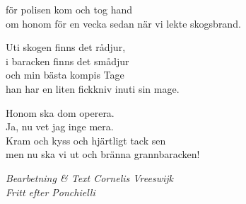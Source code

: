för polisen kom och tog hand\\
om honom för en vecka sedan när vi lekte skogsbrand.\par
\vspace{10pt}
Uti skogen finns det rådjur,\\
i baracken finns det smådjur\\
och min bästa kompis Tage\\
han har en liten fickkniv inuti sin mage.\par
\vspace{10pt}
Honom ska dom operera.\\
Ja, nu vet jag inge mera.\\
Kram och kyss och hjärtligt tack sen\\
men nu ska vi ut och bränna grannbaracken!\par
\vspace{10pt}
{\footnotesize\textit{Bearbetning \& Text Cornelis Vreeswijk \\ Fritt efter Ponchielli}}
